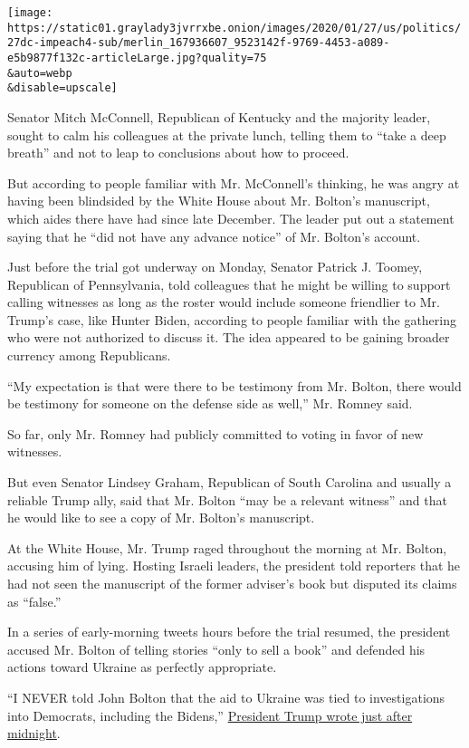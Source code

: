 \texttt{[image: https://static01.graylady3jvrrxbe.onion/images/2020/01/27/us/politics/27dc-impeach4-sub/merlin\_167936607\_9523142f-9769-4453-a089-e5b9877f132c-articleLarge.jpg?quality=75\\\&auto=webp\\\&disable=upscale]}

Senator Mitch McConnell, Republican of Kentucky and the majority leader,
sought to calm his colleagues at the private lunch, telling them to
``take a deep breath'' and not to leap to conclusions about how to
proceed.

But according to people familiar with Mr. McConnell's thinking, he was
angry at having been blindsided by the White House about Mr. Bolton's
manuscript, which aides there have had since late December. The leader
put out a statement saying that he ``did not have any advance notice''
of Mr. Bolton's account.

Just before the trial got underway on Monday, Senator Patrick J. Toomey,
Republican of Pennsylvania, told colleagues that he might be willing to
support calling witnesses as long as the roster would include someone
friendlier to Mr. Trump's case, like Hunter Biden, according to people
familiar with the gathering who were not authorized to discuss it. The
idea appeared to be gaining broader currency among Republicans.

``My expectation is that were there to be testimony from Mr. Bolton,
there would be testimony for someone on the defense side as well,'' Mr.
Romney said.

So far, only Mr. Romney had publicly committed to voting in favor of new
witnesses.

But even Senator Lindsey Graham, Republican of South Carolina and
usually a reliable Trump ally, said that Mr. Bolton ``may be a relevant
witness'' and that he would like to see a copy of Mr. Bolton's
manuscript.

At the White House, Mr. Trump raged throughout the morning at Mr.
Bolton, accusing him of lying. Hosting Israeli leaders, the president
told reporters that he had not seen the manuscript of the former
adviser's book but disputed its claims as ``false.''

In a series of early-morning tweets hours before the trial resumed, the
president accused Mr. Bolton of telling stories ``only to sell a book''
and defended his actions toward Ukraine as perfectly appropriate.

``I NEVER told John Bolton that the aid to Ukraine was tied to
investigations into Democrats, including the Bidens,''
\href{https://twitter.com/realDonaldTrump/status/1221663763138588672}{President
Trump wrote just after midnight}.

